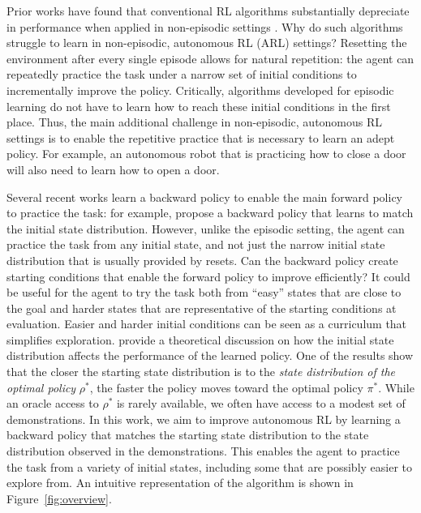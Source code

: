 \documentclass[nohyperref]{article}
\theoremstyle{plain}
\theoremstyle{definition}
\theoremstyle{remark}
\begin{document}
Prior works have found that conventional RL algorithms substantially depreciate in performance when applied in non-episodic settings \citep{co2020ecological, zhu20ingredients, sharma2021autonomous}.
Why do such algorithms struggle to learn in non-episodic, autonomous RL (ARL) settings?
Resetting the environment after every single episode allows for natural repetition: the agent can repeatedly practice the task under a narrow set of initial conditions to incrementally improve the policy. Critically, algorithms developed for episodic learning do not have to learn how to reach these initial conditions in the first place. Thus, the main additional challenge in non-episodic, autonomous RL settings is to enable the repetitive practice that is necessary to learn an adept policy. For example, an autonomous robot that is practicing how to close a door will also need to learn how to open a door.

Several recent works learn a backward policy to enable the main forward policy to practice the task: for example, \citet{han2015learning, eysenbach2017leave} propose a backward policy that learns to match the initial state distribution.
However, unlike the episodic setting, the agent can practice the task from any initial state, and not just the narrow initial state distribution that is usually provided by resets. Can the backward policy create starting conditions that enable the forward policy to improve efficiently? It could be useful for the agent to try the task both from ``easy'' states that are close to the goal and harder states that are representative of the starting conditions at evaluation. Easier and harder initial conditions can be seen as a curriculum that simplifies exploration.
\citet{kakade2002approximately} provide a theoretical discussion on how the initial state distribution affects the performance of the learned policy. One of the results show that the closer the starting state distribution is to the \textit{state distribution of the optimal policy} $\rho^*$, the faster the policy moves toward the optimal policy $\pi^*$.
While an oracle access to $\rho^*$ is rarely available, we often have access to a modest set of demonstrations. In this work, we aim to improve autonomous RL by learning a backward policy that matches the starting state distribution to the state distribution observed in the demonstrations.
This enables the agent to practice the task from a variety of initial states, including some that are possibly easier to explore from. An intuitive representation of the algorithm is shown in Figure~\ref{fig:overview}.
\end{document}
